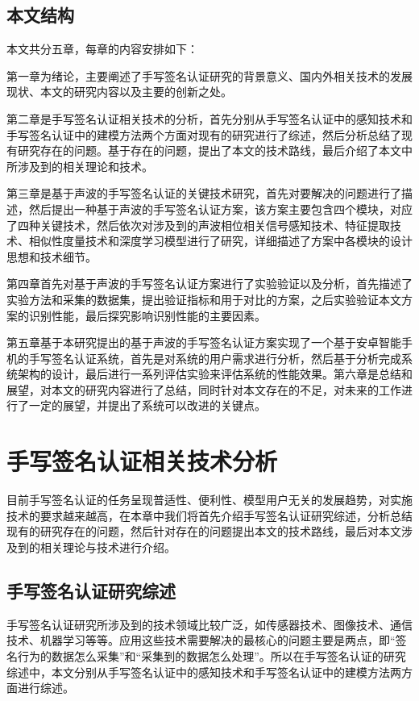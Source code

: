 \section{本文结构}

本文共分五章，每章的内容安排如下：

第一章为绪论，主要阐述了手写签名认证研究的背景意义、国内外相关技术的发展现状、本文的研究内容以及主要的创新之处。

第二章是手写签名认证相关技术的分析，首先分别从手写签名认证中的感知技术和手写签名认证中的建模方法两个方面对现有的研究进行了综述，然后分析总结了现有研究存在的问题。基于存在的问题，提出了本文的技术路线，最后介绍了本文中所涉及到的相关理论和技术。

第三章是基于声波的手写签名认证的关键技术研究，首先对要解决的问题进行了描述，然后提出一种基于声波的手写签名认证方案，该方案主要包含四个模块，对应了四种关键技术，然后依次对涉及到的声波相位相关信号感知技术、特征提取技术、相似性度量技术和深度学习模型进行了研究，详细描述了方案中各模块的设计思想和技术细节。

第四章首先对基于声波的手写签名认证方案进行了实验验证以及分析，首先描述了实验方法和采集的数据集，提出验证指标和用于对比的方案，之后实验验证本文方案的识别性能，最后探究影响识别性能的主要因素。

第五章基于本研究提出的基于声波的手写签名认证方案实现了一个基于安卓智能手机的手写签名认证系统，首先是对系统的用户需求进行分析，然后基于分析完成系统架构的设计，最后进行一系列评估实验来评估系统的性能效果。第六章是总结和展望，对本文的研究内容进行了总结，同时针对本文存在的不足，对未来的工作进行了一定的展望，并提出了系统可以改进的关键点。

\chapter{手写签名认证相关技术分析}
\label{chap:related-work}
目前手写签名认证的任务呈现普适性、便利性、模型用户无关的发展趋势，对实施技术的要求越来越高，在本章中我们将首先介绍手写签名认证研究综述，分析总结现有的研究存在的问题，然后针对存在的问题提出本文的技术路线，最后对本文涉及到的相关理论与技术进行介绍。
\section{手写签名认证研究综述}
手写签名认证研究所涉及到的技术领域比较广泛，如传感器技术、图像技术、通信技术、机器学习等等。应用这些技术需要解决的最核心的问题主要是两点，即“签名行为的数据怎么采集”和“采集到的数据怎么处理”。所以在手写签名认证的研究综述中，本文分别从手写签名认证中的感知技术和手写签名认证中的建模方法两方面进行综述。
